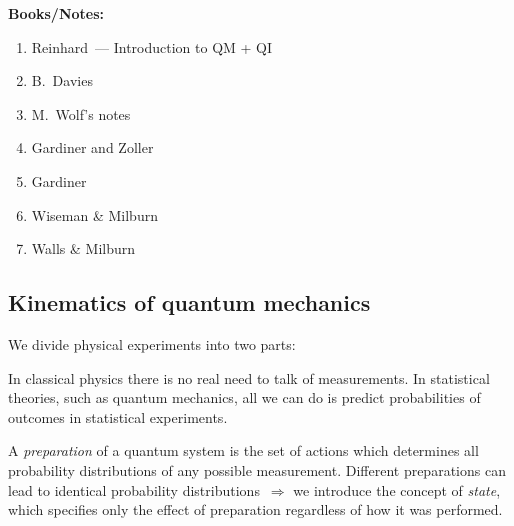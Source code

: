 \medskip
\noindent\textbf{Books/Notes:}
\begin{enumerate}[(1)]
  \item Reinhard~--- Introduction to QM + QI~\cite{Reinhard2012}
  \item B.~Davies~\cite{Davies76}
  \item M.~Wolf's notes~\cite{Wolf12}
  \item Gardiner and Zoller~\cite{GardinerZoller04}
  \item Gardiner~\cite{Gardiner09}
  \item Wiseman \& Milburn~\cite{WisemanMilburn10}
  \item Walls \& Milburn~\cite{WallsMilburn08}
\end{enumerate}

\subsection{Kinematics of quantum mechanics}\label{sec:kinematics}

We divide physical experiments into two parts:

\begin{center}
\end{center}

In classical physics there is no real need to talk of measurements.  In
statistical theories, such as quantum mechanics, all we can do is predict
probabilities of outcomes in statistical experiments.

\begin{definition}[Preparation]\label{def:preparation}
  A \emph{preparation} of a quantum system is the set of actions which
  determines all probability distributions of any possible measurement.
  Different preparations can lead to identical probability
  distributions~$\Rightarrow$ we introduce the concept of \emph{state},
  which specifies only the effect of preparation regardless of how it was
  performed.
\end{definition}

